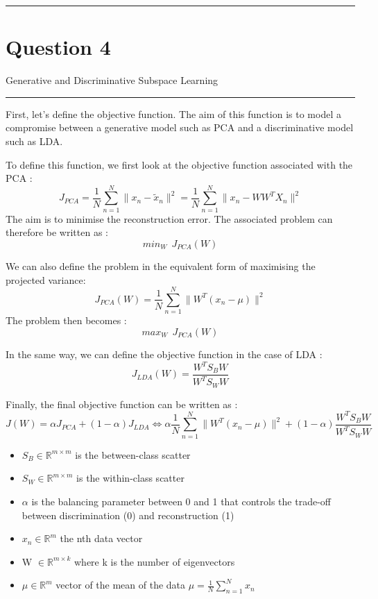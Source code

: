 \clearpage
\rule{\textwidth}{1mm}
\vspace{-2em}
\section{Question 4} Generative and Discriminative Subspace Learning
\newline
\rule{\textwidth}{1mm}

First, let's define the objective function. The aim of this function is to model a compromise between a generative model such as PCA and a discriminative model such as LDA.

To define this function, we first look at the objective function associated with the PCA : 
$$ J_{PCA} = \frac{1}{N} \sum_{n = 1}^{N} {\lVert x_n - \tilde{x}_n \rVert ^2} = \frac{1}{N} \sum_{n = 1}^{N}{\lVert x_n - WW^TX_n \rVert^2} $$ 
The aim is to minimise the reconstruction error.  The associated problem can therefore be written as : 
$$ min_W\ \ J_{PCA}(W) $$

We can also define the problem in the equivalent form of maximising the projected variance:
$$ J_{PCA}(W) =  \frac{1}{N} \sum_{n = 1}^{N}{\lVert W^T(x_n - \mu) \rVert^2} $$
The problem then becomes : 
$$ max_W\ \ J_{PCA}(W) $$

In the same way, we can define the objective function in the case of LDA :
$$ J_{LDA}(W) = \dfrac{W^TS_BW}{W^TS_WW} $$

Finally, the final objective function can be written as :
$$ J(W) = \alpha J_{PCA} + (1 - \alpha) J_{LDA} \Leftrightarrow \alpha \frac{1}{N} \sum_{n = 1}^{N}{\lVert W^T(x_n - \mu) \rVert^2} + (1 - \alpha) \dfrac{W^TS_BW}{W^TS_WW}  $$


\begin{itemize}
	\item $S_B \in \mathbb{R}^{m \times m}$ is the between-class scatter
	\item $S_W \in \mathbb{R}^{m \times m}$ is the within-class scatter
	\item $\alpha$ is the balancing parameter between 0 and 1 that controls the trade-off between discrimination (0) and reconstruction (1)
	\item $x_n \in \mathbb{R}^{m}$ the nth data vector
	\item W $\in \mathbb{R}^{m \times k}$  where k is the number of eigenvectors
	\item $\mu \in \mathbb{R}^{m}$ vector of the mean of the data  $\mu = \frac{1}{N} \sum_{n = 1}^{N} x_n $ 
\end{itemize}


